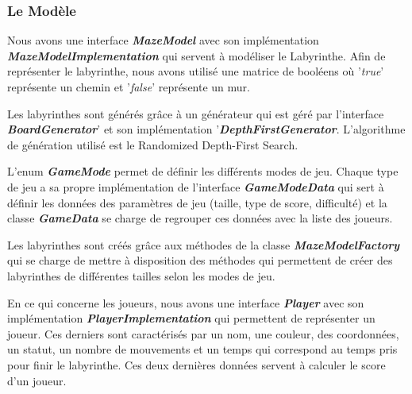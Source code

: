 \subsubsection{Le Modèle}
\label{subsubsec:modele}

Nous avons une interface \textbf{\textit{MazeModel}} avec son implémentation
\textbf{\textit{MazeModelImplementation}} qui servent à modéliser le Labyrinthe.
Afin de représenter le labyrinthe, nous avons utilisé une matrice de booléens
où '\textit{true}' représente un chemin et '\textit{false}' représente un mur.

Les labyrinthes sont générés grâce à un générateur qui est géré par
l'interface \textbf{\textit{BoardGenerator}}' et son implémentation '\textbf{\textit{DepthFirstGenerator}}.
L'algorithme de génération utilisé est le Randomized Depth-First Search.

L'enum \textbf{\textit{GameMode}} permet de définir les différents modes de jeu.
Chaque type de jeu a sa propre implémentation de l'interface \textbf{\textit{GameModeData}}
qui sert à définir les données des paramètres de jeu
(taille, type de score, difficulté) et la classe \textbf{\textit{GameData}} se charge de
regrouper ces données avec la liste des joueurs.

Les labyrinthes sont créés grâce aux méthodes de la classe
\textbf{\textit{MazeModelFactory}} qui se charge de mettre à disposition des méthodes
qui permettent de créer des labyrinthes de différentes tailles selon les modes
de jeu.

En ce qui concerne les joueurs, nous avons une interface \textbf{\textit{Player}} avec son
implémentation \textbf{\textit{PlayerImplementation}} qui permettent de représenter un
joueur. Ces derniers sont caractérisés par un nom, une couleur, des coordonnées, un
statut, un nombre de mouvements et un temps qui correspond au temps pris pour finir le labyrinthe.
Ces deux dernières données servent à calculer le score d'un joueur.

